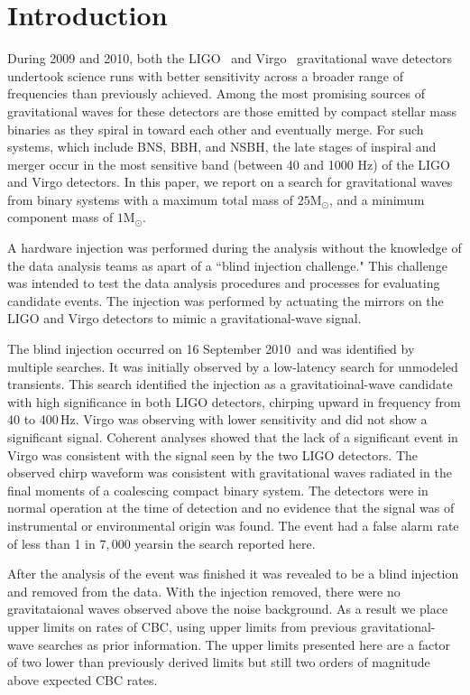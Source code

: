 \documentclass[prd,superscriptaddress,showpacs,amssymb,amsmath,amsfonts,aps,altaffilletter,nofootinbib,letterpaper,twocolumn]{revtex4}
\def\Msun{\ensuremath{\mathrm{M_{\odot}}}}
\def\sfivelvc{S5LowMassLV}
\def\dogDate{16 September 2010}
\def\dogFAR{1 in $7,000$ years}
\begin{document}
\section{Introduction}\label{sec:overview}

During 2009 and 2010, both the \ac{LIGO}~\cite{Abbott:2007kv} and
Virgo~\cite{Acernese:2008b} gravitational wave detectors undertook
science runs with better sensitivity across a broader range of frequencies
than previously achieved.  Among the most promising sources of
gravitational waves for these detectors are those emitted by compact
stellar mass binaries as they spiral in toward each other and eventually
merge.    For such systems, which include \ac{BNS}, \ac{BBH}, and
\ac{NSBH}, the late stages of inspiral and merger occur in the most
sensitive band (between 40 and 1000 Hz) of the \ac{LIGO} and Virgo
detectors.  In this paper, we report on a search for gravitational waves
from binary systems with a maximum total mass of $25\Msun$, and a
minimum component mass of $1\Msun$.  

A hardware injection was performed during the analysis without the knowledge of
the data analysis teams as apart of a ``blind injection challenge." This
challenge was intended to test the data analysis procedures and processes for
evaluating candidate events. The injection was performed by actuating the
mirrors on the \ac{LIGO} and Virgo detectors to mimic a gravitational-wave
signal. 

The blind injection occurred on \dogDate~and was identified by multiple
searches. It was initially observed by a low-latency search for unmodeled
transients.  This search identified the injection as a gravitatioinal-wave
candidate with high significance in both LIGO detectors, chirping upward in
frequency from 40 to 400\,Hz. Virgo was observing with lower sensitivity and
did not show a significant signal. Coherent analyses showed that the lack of a
significant event in Virgo was consistent with the signal seen by the two LIGO
detectors. The observed chirp waveform was consistent with gravitational waves
radiated in the final moments of a coalescing compact binary system. The
detectors were in normal operation at the time of detection and no evidence
that the signal was of instrumental or environmental origin was found. The
event had a false alarm rate of less than \dogFAR in the search
reported here.

After the analysis of the event was finished it was revealed to be a blind
injection and removed from the data. With the injection removed, there were no
gravitataional waves observed above the noise background. As a result we place
upper limits on rates of \ac{CBC}, using upper limits from previous
gravitational-wave searches \cite{\sfivelvc} as prior information. The upper
limits presented here are a factor of two lower than previously
derived limits but still two orders of magnitude above expected \ac{CBC} rates. 
\end{document}
